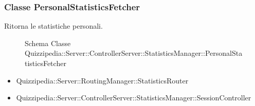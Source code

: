 \subsubsection{Classe PersonalStatisticsFetcher}
Ritorna le statistiche personali.
\begin{figure}[H]
\centering
\noindent{}
\caption[Schema Classe PersonalStatisticsFetcher]{Schema Classe Quizzipedia::Server::ControllerServer::StatisticsManager::PersonalStatisticsFetcher}
\end{figure}
\begin{itemize}
\item Quizzipedia::Server::RoutingManager::StatisticsRouter
\end{itemize}
\begin{itemize}
\item Quizzipedia::Server::ControllerServer::StatisticsManager::SessionController
\end{itemize}
